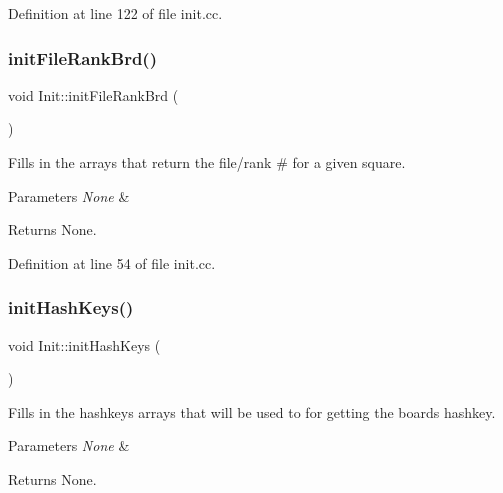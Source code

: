 Definition at line 122 of file init.\+cc.

\mbox{\label{namespaceInit_abf211e7bffeba17a44b4da8cd83dbfcd}} 
\subsubsection{\texorpdfstring{init\+File\+Rank\+Brd()}{initFileRankBrd()}}
{\footnotesize\ttfamily void Init\+::init\+File\+Rank\+Brd (\begin{DoxyParamCaption}{ }\end{DoxyParamCaption})\hspace{0.3cm}{\ttfamily [noexcept]}}



Fills in the arrays that return the file/rank \# for a given square. 


\begin{DoxyParams}{Parameters}
{\em None} & \\
\hline
\end{DoxyParams}
\begin{DoxyReturn}{Returns}
None. 
\end{DoxyReturn}


Definition at line 54 of file init.\+cc.

\mbox{\label{namespaceInit_a746ad8efce2e70882c0b862407056fe5}} 
\subsubsection{\texorpdfstring{init\+Hash\+Keys()}{initHashKeys()}}
{\footnotesize\ttfamily void Init\+::init\+Hash\+Keys (\begin{DoxyParamCaption}{ }\end{DoxyParamCaption})\hspace{0.3cm}{\ttfamily [noexcept]}}



Fills in the hashkeys arrays that will be used to for getting the board\textquotesingle{}s hashkey. 


\begin{DoxyParams}{Parameters}
{\em None} & \\
\hline
\end{DoxyParams}
\begin{DoxyReturn}{Returns}
None. 
\end{DoxyReturn}


